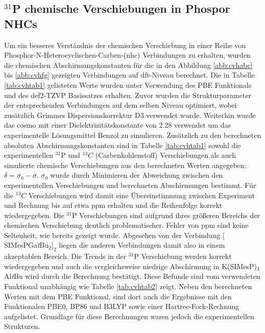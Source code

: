 \subsection{\texorpdfstring{$^{31}$P}{31P} chemische Verschiebungen in Phospor NHCs}
Um ein besseres Verständnis der chemischen Verschiebung in einer Reihe von Phosphor-N-Heterocyclischen-Carben-(\acs{nhc}) Verbindungen \supercite{lemp2017nhc} zu erhalten, wurden die chemischen Abschirmungskonstanten für die in den Abbildung \ref{abb:cvhabc} bis \ref{abb:cvhfg} gezeigten Verbindungen auf \ac{dft}-Niveau berechnet. Die in Tabelle \ref{tab:cvhtab1} gelisteten Werte wurden unter Verwendung des PBE Funktionals\supercite{perdew1996generalized} und des def2-TZVP Basissatzes\supercite{weigend2005balanced} erhalten. Zuvor wurden die Strukturparameter der entsprechenden Verbindungen auf dem selben Niveau optimiert, wobei zusätzlich Grimmes Dispersionskorrektur D3\supercite{grimme2010consistent} verwendet wurde. Weiterhin wurde das \ac{cosmo}\supercite{klamt1993cosmo} mit einer Dielektrizitätskonstante von 2.28 verwendet um das experimentelle Lösungsmittel Benzol zu simulieren. Zusätzlich zu den berechneten absoluten Abschirmungskonstanten sind in Tabelle \ref{tab:cvhtab1} sowohl die experimentellen $^{31}$P und $^{13}C$ (Carbenkohlenstoff) Verschiebungen als auch simulierte chemische Verschiebungen aus den berechneten Werten angegeben: $\delta=\sigma_0-\sigma$. $\sigma_0$ wurde durch Minimieren der Abweichung zwischen den experimentellen Verschiebungen und berechneten Abschirmungen bestimmt. Für die $^{13}C$ Verschiebungen wird damit eine Übereinstimmung zwischen Experiment und Rechnung bis auf etwa \unit[2]{ppm} erhalten und die Reihenfolge korrekt wiedergegeben. Die $^{31}$P Verschiebungen sind aufgrund ihres größeren Bereichs der chemischen Verschiebung deutlich problematischer. Fehler von \unit[30]{ppm} sind keine Seltenheit, wie bereits gezeigt wurde.\supercite{latypov2015quantum,reiter2017calculation} Abgesehen von der Verbindung $[$SIMesPGa\textit{t}Bu$_2]_2$ liegen die anderen Verbindungen damit also in einem akzeptablen Bereich. Die Trends in der $^{31}$P Verschiebung werden korrekt wiedergegeben und auch die vergleichsweise niedrige Abschirmung in K(SIMesP)$_3$Al\textit{t}Bu wird durch die Berechnung bestätigt. Diese Befunde sind vom verwendeten Funktional unabhängig wie Tabelle \ref{tab:cvhtab2} zeigt. Neben den berechneten Werten mit dem PBE Funktional, sind dort auch die Ergebnisse mit den Funktionalen PBE0\supercite{adamo1999toward}, BP86\supercite{perdew1986density,becke1988density} und B3LYP\supercite{becke1993density,lee1988development,stephens1994ab} sowie einer Hartree-Fock-Rechnung aufgelistet. Grundlage für diese Berechnungen waren jedoch die experimentellen Strukturen.


